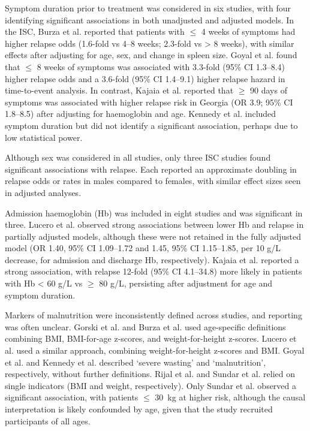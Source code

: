 Symptom duration prior to treatment was considered in six studies, with four identifying significant associations in both unadjusted and adjusted models\cite{burza2014, goyal2019, goyal2020, kajaia2011}. In the ISC, Burza et al. reported that patients with $\leq$ 4 weeks of symptoms had higher relapse odds (1.6-fold vs 4--8 weeks; 2.3-fold vs > 8 weeks), with similar effects after adjusting for age, sex, and change in spleen size\cite{burza2014}. Goyal et al. found that $\leq$ 8 weeks of symptoms was associated with 3.3-fold (95\% CI 1.3--8.4) higher relapse odds\cite{goyal2019} and a 3.6-fold (95\% CI 1.4--9.1) higher relapse hazard in time-to-event analysis\cite{goyal2020}. In contrast, Kajaia et al. reported that $\geq$ 90 days of symptoms was associated with higher relapse risk in Georgia (OR 3.9; 95\% CI 1.8--8.5) after adjusting for haemoglobin and age\cite{kajaia2011}. Kennedy et al. included symptom duration but did not identify a significant association, perhaps due to low statistical power\cite{kennedy2024}.

Although sex was considered in all studies, only three ISC studies found significant associations with relapse\cite{burza2014, ostyn2014, sundar2019}. Each reported an approximate doubling in relapse odds\cite{burza2014, sundar2019} or rates\cite{ostyn2014} in males compared to females, with similar effect sizes seen in adjusted analyses.

Admission haemoglobin (Hb) was included in eight studies\cite{burza2014, goyal2019, kajaia2011, kennedy2024, lucero2015, rijal2013, sundar2019} and was significant in three\cite{kajaia2011, kennedy2024, lucero2015}. Lucero et al. observed strong associations between lower Hb and relapse in partially adjusted models, although these were not retained in the fully adjusted model (OR 1.40, 95\% CI 1.09--1.72 and 1.45, 95\% CI 1.15--1.85, per 10 g/L decrease, for admission and discharge Hb, respectively). Kajaia et al. reported a strong association, with relapse 12-fold (95\% CI 4.1--34.8) more likely in patients with Hb < 60 g/L vs $\geq$ 80 g/L, persisting after adjustment for age and symptom duration.

Markers of malnutrition were inconsistently defined across studies, and reporting was often unclear. Gorski et al. and Burza et al. used age-specific definitions combining BMI, BMI-for-age z-scores, and weight-for-height z-scores\cite{gorski2010, burza2014}. Lucero et al. used a similar approach, combining weight-for-height z-scores and BMI\cite{lucero2015}. Goyal et al. and Kennedy et al. described `severe wasting' and `malnutrition', respectively, without further definitions\cite{goyal2019, kennedy2024}. Rijal et al. and Sundar et al. relied on single indicators (BMI and weight, respectively)\cite{rijal2013, sundar2019}. Only Sundar et al. observed a significant association, with patients $\leq$ 30~kg at higher risk, although the causal interpretation is likely confounded by age, given that the study recruited participants of all ages\cite{sundar2019}.

